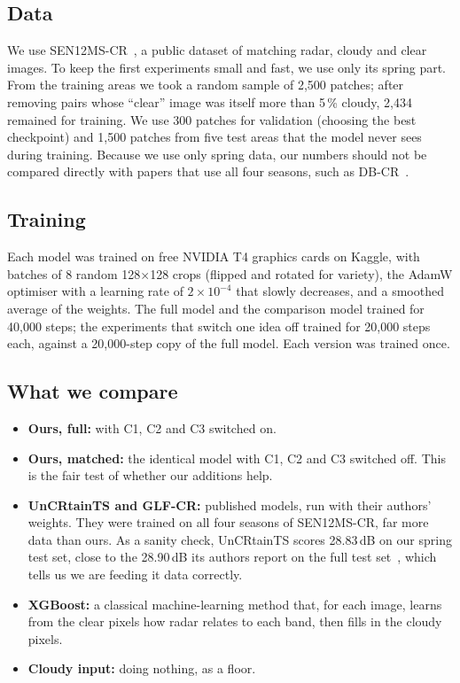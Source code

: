 \documentclass[conference]{IEEEtran}
\begin{document}
\subsection{Data}
We use SEN12MS-CR~\cite{ebel2021sen12mscr}, a public dataset of matching radar, cloudy and clear
images. To keep the first experiments small and fast, we use only its spring part. From the
training areas we took a random sample of 2,500 patches; after removing pairs whose ``clear''
image was itself more than 5\,\% cloudy, 2,434 remained for training. We use 300 patches for
validation (choosing the best checkpoint) and 1,500 patches from five test areas that the model
never sees during training. Because we use only spring data, our numbers should not be compared
directly with papers that use all four seasons, such as DB-CR~\cite{hu2025dbcr}.

\subsection{Training}
Each model was trained on free NVIDIA T4 graphics cards on Kaggle, with batches of 8 random
128$\times$128 crops (flipped and rotated for variety), the AdamW optimiser with a learning rate
of $2\times10^{-4}$ that slowly decreases, and a smoothed average of the weights. The full model and
the comparison model trained for 40,000 steps; the experiments that switch one idea off trained
for 20,000 steps each, against a 20,000-step copy of the full model. Each version was trained once.

\subsection{What we compare}
\begin{itemize}
\item \textbf{Ours, full:} with C1, C2 and C3 switched on.
\item \textbf{Ours, matched:} the identical model with C1, C2 and C3 switched off. This is the fair
test of whether our additions help.
\item \textbf{UnCRtainTS and GLF-CR:} published models, run with their authors' weights. They were
trained on all four seasons of SEN12MS-CR, far more data than ours. As a sanity check, UnCRtainTS
scores 28.83\,dB on our spring test set, close to the 28.90\,dB its authors report on the full test
set~\cite{ebel2023uncrtaints}, which tells us we are feeding it data correctly.
\item \textbf{XGBoost:} a classical machine-learning method that, for each image, learns from the
clear pixels how radar relates to each band, then fills in the cloudy pixels.
\item \textbf{Cloudy input:} doing nothing, as a floor.
\end{itemize}
\end{document}

